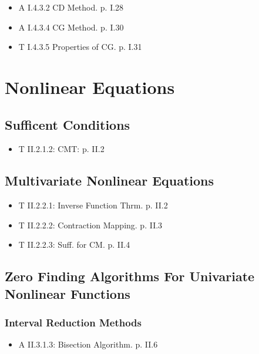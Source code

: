 \documentclass[11pt]{article}
\begin{document}
\begin{itemize}
  \item A I.4.3.2 CD Method. p. I.28
  \item A I.4.3.4 CG Method. p. I.30
  \item T I.4.3.5 Properties of CG. p. I.31
\end{itemize}

\section{Nonlinear Equations}
\label{sec:nonlinear_equations}

\subsection{Sufficent Conditions}
\label{sub:sufficent_conditions}
  \begin{itemize}
    \item T II.2.1.2: CMT: p. II.2
  \end{itemize}

\subsection{Multivariate Nonlinear Equations}
\label{sec:multivariate_nonlinear_equations}

  \begin{itemize}
    \item T II.2.2.1: Inverse Function Thrm. p. II.2
    \item T II.2.2.2: Contraction Mapping. p. II.3
    \item T II.2.2.3: Suff. for CM. p. II.4
  \end{itemize}

\subsection{Zero Finding Algorithms For Univariate Nonlinear Functions}
\label{sub:zero_finding_algorithms_for_univariate_nonlinear_functions}

  \subsubsection{Interval Reduction Methods}
  \label{subsub:interval_reduction_methods}

    \begin{itemize}
      \item A II.3.1.3: Bisection Algorithm. p. II.6
    \end{itemize}
\end{document}
